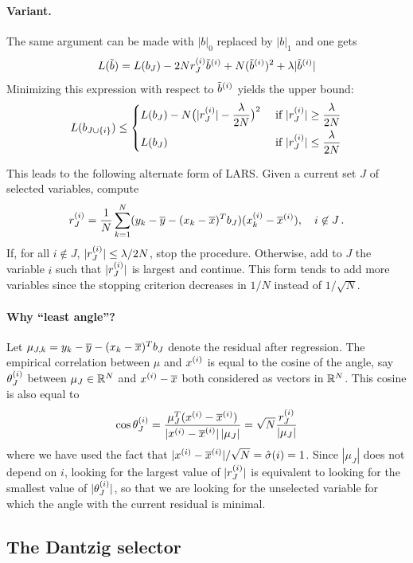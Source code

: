 \paragraph{Variant.}
 The same argument can be made with $|b|_0$ replaced by $|b|_1$ and one gets
\[
L(\tilde b) = L(b_J) - 2 N r_J^{(i)} \tilde b^{(i)} + N(\tilde b^{(i)})^2 + \lambda |\tilde b^{(i)}|
\]
Minimizing this expression with respect to $\tilde b^{(i)}$ yields the upper bound:
\[
L(b_{J\cup\{i\}}) \leq \left\{
\begin{aligned}
&L(b_J) - N \big(|r_J^{(i)}| -\frac{\lambda}{2N}\big)^2 && \text { if } |r_J^{(i)}| \geq \frac{\lambda}{2N}\\
&L(b_J)  && \text { if } |r_J^{(i)}| \leq \frac{\lambda}{2N}
\end{aligned}
\right.
\]

This leads to the following alternate form of LARS.
 Given a current set $J$ of selected variables, compute
\[
r_J^{(i)} = \frac1N \sum_{k=1}^N (y_k -\overline{y} -  (x_k-\overline{x})^Tb_J) 
(x_k^{(i)} -\overline{x}^{(i)}), \quad i\not\in J\,.
\]
If, for all $i\not\in J$, $|r_J^{(i)}| \leq \lambda/2N$, stop the procedure.
 Otherwise, add to $J$ the variable $i$ such that  $|r_J^{(i)}|$ is largest and continue.
 This form tends to add more variables since the stopping criterion decreases in $1/N$ instead of $1/\sqrt{N}$.
 \bigskip

\paragraph{Why ``least angle''?}
 Let $\mu_{J,k}  = y_k - \overline{y}- (x_k -\overline{x})^T b_J$ denote the residual after regression. 
 The empirical correlation between $\mu$ and $x^{(i)} $ is equal to the cosine of the angle, say $\theta_J^{(i)}$ between $\mu_J\in {\mathbb{R}}^N$ and $x^{(i)}  -\overline{x}$ both considered as vectors in ${\mathbb{R}}^N$. This cosine is also equal to
\[
\cos \theta_J^{(i)} = \frac{\mu_J^T(x^{(i)}  -\overline{x}^{(i)})}{|x^{(i)} -\overline{x}^{(i)}| \,|\mu_J|} =\sqrt N \frac{r_J^{(i)}}{|\mu_J|}
\]
where we have used the fact that $|x^{(i)}  -\overline{x}^{(i)}|/\sqrt N = \hat{\sigma}(i) = 1$. 
 Since $|\mu_J|$ does not depend on $i$, looking for the largest value of $|r_J^{(i)} |$ is equivalent to looking for the smallest value of $|\theta_J^{(i)} |$, so that we are looking for the unselected variable for which the angle with the
current residual is minimal.

\subsection{The Dantzig selector}

